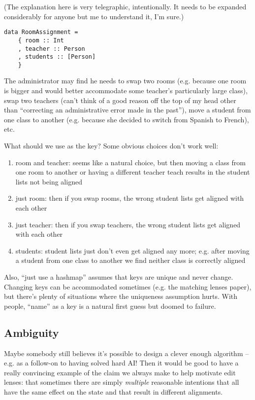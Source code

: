 (The explanation here is very telegraphic, intentionally. It needs to be
expanded considerably for anyone but me to understand it, I'm sure.)

\begin{verbatim}
data RoomAssignment =
    { room :: Int
    , teacher :: Person
    , students :: [Person]
    }
\end{verbatim}

The administrator may find he needs to swap two rooms (e.g. because one room
is bigger and would better accommodate some teacher's particularly large
class), swap two teachers (can't think of a good reason off the top of my
head other than ``correcting an administrative error made in the past''),
move a student from one class to another (e.g. because she decided to switch
from Spanish to French), etc.

What should we use as the key? Some obvious choices don't work well:
\begin{enumerate}
    \item room and teacher: seems like a natural choice, but then moving a
        class from one room to another or having a different teacher teach
        results in the student lists not being aligned
    \item just room: then if you swap rooms, the wrong student lists get aligned
        with each other
    \item just teacher: then if you swap teachers, the wrong student lists get
        aligned with each other
    \item students: student lists just don't even get aligned any more; e.g.
        after moving a student from one class to another we find neither
        class is correctly aligned
\end{enumerate}

Also, ``just use a hashmap'' assumes that keys are unique and never change.
Changing keys can be accommodated sometimes (e.g. the matching lenses
paper), but there's plenty of situations where the uniqueness assumption
hurts. With people, ``name'' as a key is a natural first guess but doomed to
failure.

\subsection{Ambiguity}
Maybe somebody still believes it's possible to design a clever enough
algorithm -- e.g. as a follow-on to having solved hard AI! Then it would be
good to have a really convincing example of the claim we always make to help
motivate edit lenses: that sometimes there are simply \emph{multiple}
reasonable intentions that all have the same effect on the state and that
result in different alignments.

